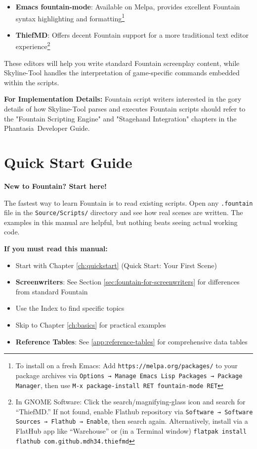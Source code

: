 \documentclass[11pt,letterpaper,oldstylefigures]{memoir}
\newcommand{\Phantasia}{{\irishfont Phantasia}}
\begin{document}
\begin{itemize}
\item \textbf{Emacs fountain-mode}: Available on Melpa, provides excellent Fountain syntax highlighting and formatting\footnote{To install on a fresh Emacs: Add \texttt{https://melpa.org/packages/} to your package archives via \texttt{Options → Manage Emacs Lisp Packages → Package Manager}, then use \texttt{M-x package-install RET fountain-mode RET}}
\item \textbf{ThiefMD}: Offers decent Fountain support for a more traditional text editor experience\footnote{In
 GNOME Software: Click the search/magnifying-glass icon and search for ``ThiefMD.''
 If not found, enable Flathub repository via \texttt{Software → Software Sources → Flathub → Enable},
 then search again. Alternatively, install via a FlatHub app like ``Warehouse'' or (in a Terminal window) \texttt{flatpak install flathub com.github.mdh34.thiefmd}}
\end{itemize}

These editors will help you write standard Fountain screenplay content, while Skyline-Tool handles the interpretation of game-specific commands embedded within the scripts.

\textbf{For Implementation Details:} Fountain script writers interested in the gory details of how Skyline-Tool parses and executes Fountain scripts should refer to the "Fountain Scripting Engine" and "Stagehand Integration" chapters in the \Phantasia\ Developer Guide.

\section{Quick Start Guide}

\textbf{New to Fountain? Start here!}

The fastest way to learn Fountain is to read existing scripts.
Open any \texttt{.fountain} file in the \texttt{Source/Scripts/}
directory and see how real scenes are written. The examples in this manual are helpful, but nothing beats seeing actual working code.

\textbf{If you must read this manual:}
\begin{itemize}
\item Start with Chapter \ref{ch:quickstart} (Quick Start: Your First Scene)
\item \textbf{Screenwriters}: See Section \ref{sec:fountain-for-screenwriters} for differences from standard Fountain
\item Use the Index to find specific topics
\item Skip to Chapter \ref{ch:basics} for practical examples
\item \textbf{Reference Tables}: See \autoref{app:reference-tables} for comprehensive data tables
\end{itemize}
\end{document}
